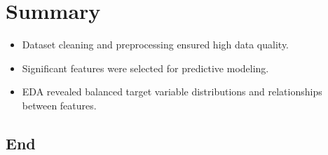\documentclass[
]{article}
\providecommand{\tightlist}{%
  \setlength{\itemsep}{0pt}\setlength{\parskip}{0pt}}
\begin{document}
\section{Summary}\label{summary}

\begin{itemize}
\tightlist
\item
  Dataset cleaning and preprocessing ensured high data quality.
\item
  Significant features were selected for predictive modeling.
\item
  EDA revealed balanced target variable distributions and relationships
  between features.
\end{itemize}

\subsection{End}\label{end}
\end{document}
